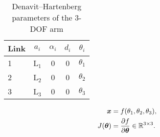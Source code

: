 ﻿\begin{table}[h]
  \centering
  \caption{Denavit--Hartenberg parameters of the 3-DOF arm}
  \label{tab:dh}
  \begin{tabular}{@{}lcccc@{}}\toprule
  Link & \(a_i\) & \(\alpha_i\) & \(d_i\) & \(\theta_i\) \\ \midrule
  1 & L\(_1\) & 0 & 0 & \(\theta_1\) \\
  2 & L\(_2\) & 0 & 0 & \(\theta_2\) \\
  3 & L\(_3\) & 0 & 0 & \(\theta_3\) \\ \bottomrule
  \end{tabular}
\end{table}

\begin{align}
  \bm{x} &= f(\theta_1,\theta_2,\theta_3), \\
  J(\bm{\theta}) &= \frac{\partial f}{\partial \bm{\theta}} \in \mathbb{R}^{3\times 3}.
\end{align}
